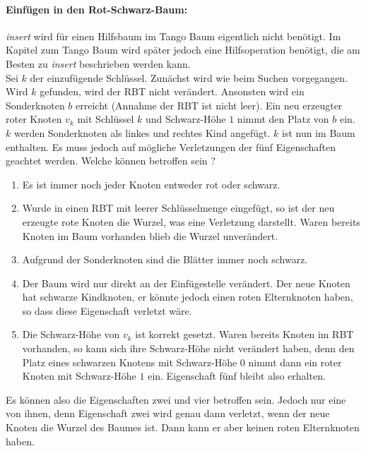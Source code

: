 \documentclass[a4paper,12pt]{article}
\begin{document}
\paragraph{Einfügen in den Rot-Schwarz-Baum:}
\textit{insert} wird für einen Hilfsbaum im Tango Baum eigentlich nicht benötigt. Im Kapitel zum Tango Baum wird später jedoch eine Hilfsoperation benötigt, die am Besten zu \textit{insert} beschrieben werden kann.\\
Sei $k$ der einzufügende Schlüssel. Zunächst wird wie beim Suchen vorgegangen. Wird $k$ gefunden, wird der RBT nicht verändert. Ansonsten wird ein Sonderknoten $b$ erreicht (Annahme der RBT ist nicht leer). Ein neu erzeugter roter Knoten $v_k$ mit Schlüssel $k$ und Schwarz-Höhe $1$ nimmt den Platz von $b$ ein. $k$ werden Sonderknoten als linkes und rechtes Kind angefügt. $k$ ist nun im Baum enthalten. Es muss jedoch auf mögliche Verletzungen der fünf Eigenschaften geachtet werden. Welche können betroffen sein ?

\begin{enumerate}
	\item Es ist immer noch jeder Knoten entweder rot oder schwarz.
	\item Wurde in einen RBT mit leerer Schlüsselmenge eingefügt, so ist der neu erzeugte rote Knoten die Wurzel, was eine Verletzung darstellt. Waren bereits Knoten im Baum vorhanden blieb die Wurzel unverändert.
	\item Aufgrund der Sonderknoten sind die Blätter immer noch schwarz.
	\item Der Baum wird nur direkt an der Einfügestelle verändert. Der neue Knoten hat schwarze Kindknoten, er könnte jedoch einen roten Elternknoten haben, so dass diese Eigenschaft verletzt wäre.
	\item Die Schwarz-Höhe von $v_k$ ist korrekt gesetzt. Waren bereits Knoten im RBT vorhanden, so kann sich ihre Schwarz-Höhe nicht verändert haben, denn den Platz eines schwarzen Knotens mit Schwarz-Höhe $0$ nimmt dann ein roter Knoten mit Schwarz-Höhe $1$ ein. Eigenschaft fünf bleibt also erhalten. 
\end{enumerate}  

\noindent Es können also die Eigenschaften zwei und vier betroffen sein. Jedoch nur eine von ihnen, denn Eigenschaft zwei wird genau dann verletzt, wenn der neue Knoten die Wurzel des Baumes ist. Dann kann er aber keinen roten Elternknoten haben.
\end{document}
